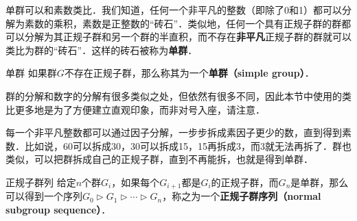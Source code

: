 

单群可以和素数类比．我们知道，任何一个非平凡的整数（即除了0和1）都可以分解为素数的乘积，素数是正整数的“砖石”．类似地，任何一个具有正规子群的群都可以分解为其正规子群和另一个群的半直积，而不存在\textbf{非平凡}正规子群的群就可以类比为群的“砖石”．这样的砖石被称为\textbf{单群}．

\begin{definition}{单群}
如果群$G$不存在正规子群，那么称其为一个\textbf{单群（simple group）}．
\end{definition}

群的分解和数字的分解有很多类似之处，但依然有很多不同，因此本节中使用的类比更多地是为了方便建立直观印象，而非对号入座，请注意．

每一个非平凡整数都可以通过因子分解，一步步拆成素因子更少的数，直到得到素数．比如说，60可以拆成30，30可以拆成15，15再拆成3，而3就无法再拆了．群也类似，可以把群拆成自己的正规子群，直到不再能拆，也就是得到单群．

\begin{definition}{正规子群列}
给定$n$个群$G_i$，如果每个$G_{i+1}$都是$G_{i}$的正规子群，而$G_n$是单群，那么可以得到一个序列$G_0\triangleright G_1\triangleright\cdots\triangleright G_n$，称之为一个\textbf{正规子群序列（normal subgroup sequence）}．
\end{definition}












